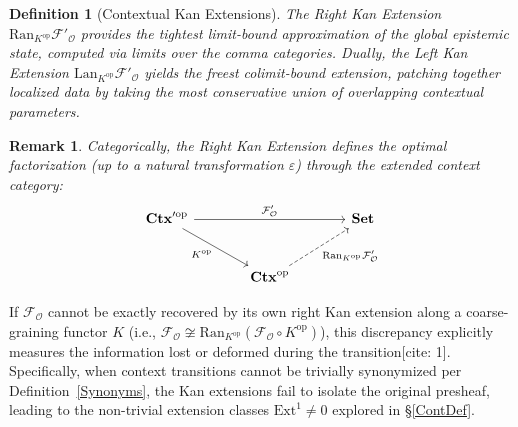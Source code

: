 \documentclass{article}
\newtheorem{dn}{Definition}
\newtheorem{rk}{Remark}
\numberwithin{tm}{section}
\numberwithin{dn}{section}
\numberwithin{as}{section}
\numberwithin{rk}{section}
\numberwithin{lem}{section}
\numberwithin{ax}{section}
\numberwithin{pp}{section}
\numberwithin{eg}{section}
\numberwithin{war}{section}
\numberwithin{equation}{section}
\numberwithin{prop}{section}
\numberwithin{nt}{section}
\numberwithin{rc}{section}
\begin{document}
\begin{dn}[Contextual Kan Extensions]
	The \emph{Right Kan Extension} $\mathrm{Ran}_{K^{\text{op}}} \mathcal{F}'_\mathcal{O}$ provides the tightest limit-bound approximation of the global epistemic state, computed via limits over the comma categories. Dually, the \emph{Left Kan Extension} $\mathrm{Lan}_{K^{\text{op}}} \mathcal{F}'_\mathcal{O}$ yields the freest colimit-bound extension, patching together localized data by taking the most conservative union of overlapping contextual parameters.
\end{dn}

\begin{rk}
	Categorically, the Right Kan Extension defines the optimal factorization (up to a natural transformation $\varepsilon$) through the extended context category:
	\begin{equation}
		\begin{tikzcd}[row sep=large, column sep=large]
			\mathbf{Ctx}'^{\text{op}} \arrow[rr, "\mathcal{F}'_\mathcal{O}"] \arrow[dr, "K^{\text{op}}"'] & & \mathbf{Set} \\
			& \mathbf{Ctx}^{\text{op}} \arrow[ur, dashed, "\mathrm{Ran}_{K^{\text{op}}} \mathcal{F}'_\mathcal{O}"'] &
		\end{tikzcd}
	\end{equation}
\end{rk}

If $\mathcal{F}_\mathcal{O}$ cannot be exactly recovered by its own right Kan extension along a coarse-graining functor $K$ (i.e., $\mathcal{F}_\mathcal{O} \not\cong \mathrm{Ran}_{K^{\text{op}}} (\mathcal{F}_\mathcal{O} \circ K^{\text{op}})$), this discrepancy explicitly measures the information lost or deformed during the transition[cite: 1]. Specifically, when context transitions cannot be trivially synonymized per Definition~\ref{Synonyms}, the Kan extensions fail to isolate the original presheaf, leading to the non-trivial extension classes $\text{Ext}^1 \neq 0$ explored in \S\ref{ContDef}.
\end{document}
